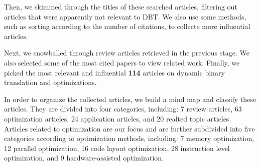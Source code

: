 Then, we skimmed through the titles of these searched articles, filtering out articles that were apparently not relevant to DBT.
We also use some methods, such as sorting according to the number of citations, to collecte more influential articles.

Next, we snowballed through review articles retrieved in the previous stage.
We also selected some of the most cited papers to view related work.
Finally, we picked the most relevant and influential \textbf{114} articles on dynamic binary translation and optimizations.

In order to organize the collected articles, we build a mind map and classify these articles.
They are divided into four categories, including: 7 review articles, 63 optimization articles, 24 application articles, and 20 realted topic articles. 
Articles related to optimization are our focus and are further subdivided into five categories according to optimization methods, including: 7 memory optimization, 12 parallel optimization, 16 code layout optimization, 28 instruction level optimization, and 9 hardware-assisted optimization. 
